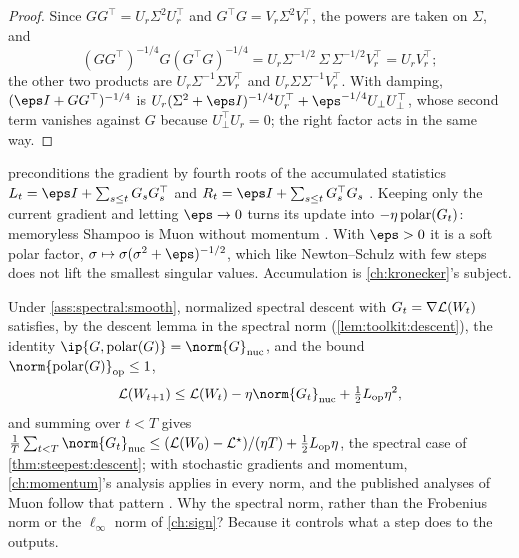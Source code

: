 \begin{refsection}
\begin{proof}
Since $GG^\top=U_r\Sigma^2U_r^\top$ and $G^\top G=V_r\Sigma^2V_r^\top$, the powers are taken on $\Sigma$, and
\[
  (GG^\top)^{-1/4}G(G^\top G)^{-1/4}=U_r\Sigma^{-1/2}\,\Sigma\,\Sigma^{-1/2}V_r^\top=U_rV_r^\top ;
\]
the other two products are $U_r\Sigma^{-1}\Sigma V_r^\top$ and $U_r\Sigma\Sigma^{-1}V_r^\top$. With damping, $(\eps I+GG^\top)^{-1/4}$ is $U_r(\Sigma^2+\eps I)^{-1/4}U_r^\top+\eps^{-1/4}U_\perp U_\perp^\top$, whose second term vanishes against $G$ because $U_\perp^\top U_r=0$; the right factor acts in the same way.
\end{proof}

 preconditions the gradient by fourth roots of the accumulated statistics $L_t=\eps I+\sum_{s\le t}G_sG_s^\top$ and $R_t=\eps I+\sum_{s\le t}G_s^\top G_s$ \parencite{GuptaKorenSinger2018}. Keeping only the current gradient and letting $\eps\to0$ turns its update into $-\eta\operatorname{polar}(G_t)$: memoryless Shampoo is Muon without momentum \parencite{BernsteinNewhouse2024}. With $\eps>0$ it is a soft polar factor, $\sigma\mapsto\sigma(\sigma^2+\eps)^{-1/2}$, which like Newton--Schulz with few steps does not lift the smallest singular values. Accumulation is \cref{ch:kronecker}'s subject.

Under \cref{ass:spectral:smooth}, normalized spectral descent with $G_t=\nabla\mathcal{L}(W_t)$ satisfies, by the descent lemma in the spectral norm (\cref{lem:toolkit:descent}), the identity $\ip{G,\polar(G)}=\norm{G}_{\nuc}$, and the bound $\norm{\polar(G)}_{\op}\le1$,
\begin{equation}\label{eq:spectral:rate}
  \Loss(W_{t+1})\le\Loss(W_t)-\eta\norm{G_t}_{\nuc}+\tfrac12L_{\op}\eta^2 ,
\end{equation}
and summing over $t<T$ gives $\frac1T\sum_{t<T}\norm{G_t}_{\nuc}\le(\Loss(W_0)-\Loss^\star)/(\eta T)+\frac12L_{\op}\eta$, the spectral case of \cref{thm:steepest:descent}; with stochastic gradients and momentum, \cref{ch:momentum}'s analysis applies in every norm, and the published analyses of Muon follow that pattern \parencite{LiHong2025,Kovalev2025,ShenEtAl2025,PethickEtAl2025}. Why the spectral norm, rather than the Frobenius norm or the $\ell_\infty$ norm of \cref{ch:sign}? Because it controls what a step does to the outputs.


\end{refsection}
